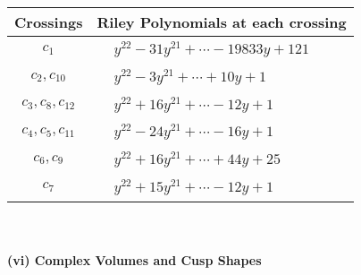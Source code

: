 \documentclass[1p]{elsarticle_modified}
\theoremstyle{definition}
\begin{document}
\begin{tabular}{m{50pt}|m{274pt}}
Crossings & \hspace{64pt}Riley Polynomials at each crossing \\
\hline $$\begin{aligned}c_{1}\end{aligned}$$&$\begin{aligned}
&y^{22}-31 y^{21}+\cdots-19833 y+121
\end{aligned}$\\
\hline $$\begin{aligned}c_{2},c_{10}\end{aligned}$$&$\begin{aligned}
&y^{22}-3 y^{21}+\cdots+10 y+1
\end{aligned}$\\
\hline $$\begin{aligned}c_{3},c_{8},c_{12}\end{aligned}$$&$\begin{aligned}
&y^{22}+16 y^{21}+\cdots-12 y+1
\end{aligned}$\\
\hline $$\begin{aligned}c_{4},c_{5},c_{11}\end{aligned}$$&$\begin{aligned}
&y^{22}-24 y^{21}+\cdots-16 y+1
\end{aligned}$\\
\hline $$\begin{aligned}c_{6},c_{9}\end{aligned}$$&$\begin{aligned}
&y^{22}+16 y^{21}+\cdots+44 y+25
\end{aligned}$\\
\hline $$\begin{aligned}c_{7}\end{aligned}$$&$\begin{aligned}
&y^{22}+15 y^{21}+\cdots-12 y+1
\end{aligned}$\\
\hline
\end{tabular}\\~\\
\newpage\flushleft \textbf{(vi) Complex Volumes and Cusp Shapes}
\end{document}

